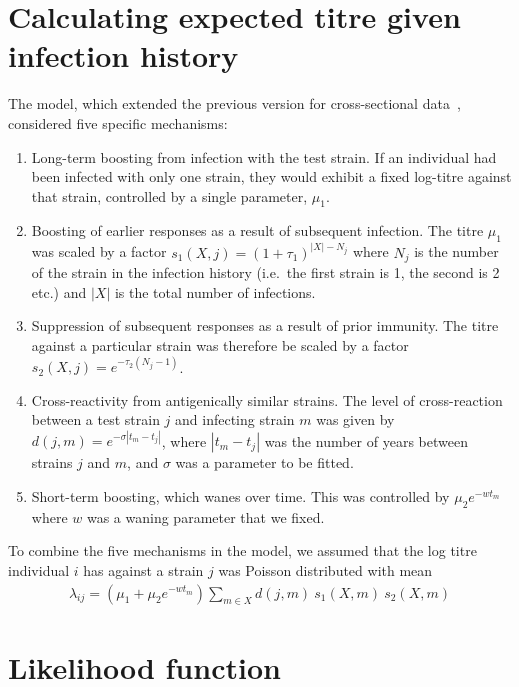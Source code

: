 \documentclass[12pt]{article}
\begin{document}
\section{Calculating expected titre given infection history}

The model, which extended the previous version for cross-sectional  data~\cite{kucharski2015estimating}, considered five specific mechanisms:
\begin{enumerate}
\item Long-term boosting from infection with the test strain. If an individual had been infected with only one strain, they would exhibit a fixed log-titre against that strain, controlled by a single parameter, $\mu_1$. 
\item Boosting of earlier responses as a result of subsequent infection. The titre $\mu_1$ was scaled by a factor $s_1(X,j) = (1+\tau_1)^{|X| - N_j}$ where $N_j$ is the number of the strain in the infection history (i.e.~the first strain is 1, the second is 2 etc.) and $|X|$ is the total number of infections.
\item Suppression of subsequent responses as a result of prior immunity. The titre against a particular strain was therefore be scaled by a factor $s_2(X,j) = e^{-\tau_2 (N_j-1)}$.
\item Cross-reactivity from antigenically similar strains. The level of cross-reaction between a test strain $j$ and infecting strain $m$ was given by $d(j,m)= e^{-\sigma |t_m - t_j|}$, where $|t_m - t_j|$ was the number of years between strains $j$ and $m$, and $\sigma$ was a parameter to be fitted.
\item Short-term boosting, which wanes over time. This was controlled by $\mu_2 e^{-w t_m}$ where $w$ was a waning parameter that we fixed.
\end{enumerate}
To combine the five mechanisms in the model, we assumed that the log titre individual $i$ has against a strain $j$ was Poisson distributed with mean
\begin{align}
\lambda_{ij}=  (\mu_1+\mu_2 e^{-w t_m}) \sum_{m\in X} d(j,m)~  s_1(X,m)~s_2(X,m) 
\end{align}

\section{Likelihood function}
\end{document}
